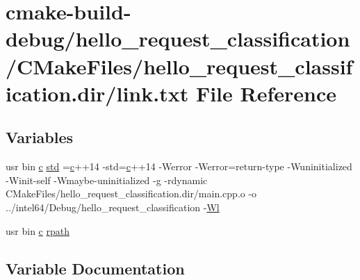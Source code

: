 \hypertarget{hello__request__classification_2CMakeFiles_2hello__request__classification_8dir_2link_8txt}{}\section{cmake-\/build-\/debug/hello\+\_\+request\+\_\+classification/\+C\+Make\+Files/hello\+\_\+request\+\_\+classification.dir/link.txt File Reference}
\label{hello__request__classification_2CMakeFiles_2hello__request__classification_8dir_2link_8txt}
\subsection*{Variables}
\begin{DoxyCompactItemize}
\item 
usr bin \hyperlink{CMakeCache_8txt_aac1d6a1710812201527c735f7c6afbaa}{c} \hyperlink{hello__request__classification_2CMakeFiles_2hello__request__classification_8dir_2link_8txt_a1ccfea5f558575a112db71eeb271fabf}{std} =\hyperlink{CMakeCache_8txt_aac1d6a1710812201527c735f7c6afbaa}{c}++14 -\/std=\hyperlink{CMakeCache_8txt_aac1d6a1710812201527c735f7c6afbaa}{c}++14 -\/Werror -\/Werror=return-\/type -\/Wuninitialized -\/Winit-\/self -\/Wmaybe-\/uninitialized -\/g -\/rdynamic C\+Make\+Files/hello\+\_\+request\+\_\+classification.\+dir/main.\+cpp.\+o -\/o ../intel64/Debug/hello\+\_\+request\+\_\+classification -\/\hyperlink{thirdparty_2extension_2CMakeFiles_2cpu__extension_8dir_2link_8txt_af9ccbf658ed2deb89d0d79f211e5b033}{Wl}
\item 
usr bin \hyperlink{CMakeCache_8txt_aac1d6a1710812201527c735f7c6afbaa}{c} \hyperlink{hello__request__classification_2CMakeFiles_2hello__request__classification_8dir_2link_8txt_ab9d7fd7120fafa2118a4e08c1df697c7}{rpath}
\end{DoxyCompactItemize}


\subsection{Variable Documentation}
